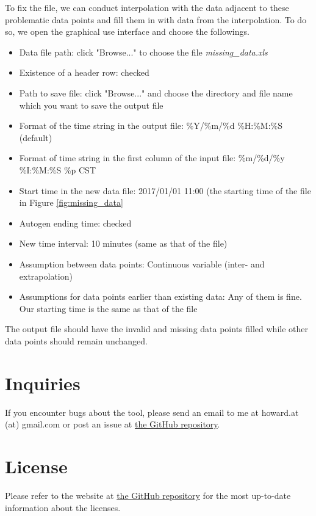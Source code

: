 \documentclass[12pt,a4paper]{article}
\begin{document}
To fix the file, we can conduct interpolation with the data adjacent to these problematic data points and fill them in with data from the interpolation.
To do so, we open the graphical use interface and choose the followings.
\begin{itemize}
\item Data file path: click "Browse..." to choose the file \emph{missing\_data.xls}
\item Existence of a header row: checked
\item Path to save file: click "Browse..." and choose the directory and file name which you want to save the output file
\item Format of the time string in the output file: \%Y/\%m/\%d \%H:\%M:\%S (default)
\item Format of time string in the first column of the input file: \%m/\%d/\%y \%I:\%M:\%S \%p CST
\item Start time in the new data file: 2017/01/01 11:00 (the starting time of the file in Figure \ref{fig:missing_data}
\item Autogen ending time: checked
\item New time interval: 10 minutes (same as that of the file)
\item Assumption between data points: Continuous variable (inter- and extrapolation)
\item Assumptions for data points earlier than existing data: Any of them is fine. Our starting time is the same as that of the file
\end{itemize}

The output file should have the invalid and missing data points filled while other data points should remain unchanged.

\section{Inquiries}

If you encounter bugs about the tool, please send an email to me at howard.at (at) gmail.com or post an issue at \href{https://github.com/howardcheung/data-preprocessing-helper/}{the GitHub repository}.

\section{License}

Please refer to the website at \href{https://github.com/howardcheung/data-preprocessing-helper/}{the GitHub repository} for the most up-to-date information about the licenses.
\end{document}
